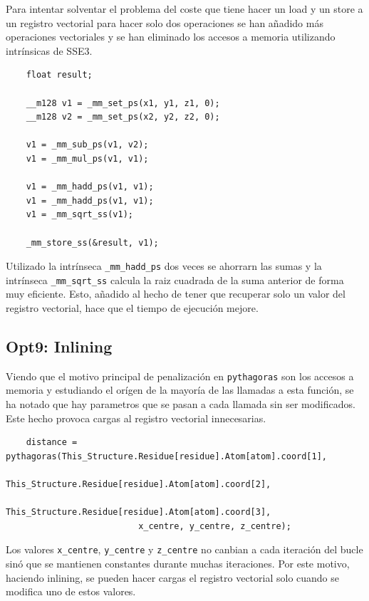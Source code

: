 Para intentar solventar el problema del coste que tiene hacer un load y un store
a un registro vectorial para hacer solo dos operaciones se han a\~{n}adido
m\'{a}s operaciones vectoriales y se han eliminado los accesos a memoria
utilizando intr\'{i}nsicas de SSE3.

\begin{lstlisting}
	float result;
	
	__m128 v1 = _mm_set_ps(x1, y1, z1, 0);
	__m128 v2 = _mm_set_ps(x2, y2, z2, 0);
	
	v1 = _mm_sub_ps(v1, v2);
	v1 = _mm_mul_ps(v1, v1);

	v1 = _mm_hadd_ps(v1, v1);
	v1 = _mm_hadd_ps(v1, v1);
	v1 = _mm_sqrt_ss(v1);	
	
	_mm_store_ss(&result, v1);
\end{lstlisting}

Utilizado la intr\'{i}nseca \texttt{\_mm\_hadd\_ps} dos veces se ahorrarn las
sumas y la intr\'{i}nseca \texttt{\_mm\_sqrt\_ss} calcula la raiz cuadrada de la
suma anterior de forma muy eficiente. Esto, a\~{n}adido al hecho de tener que
recuperar solo un valor del registro vectorial, hace que el tiempo de
ejecuci\'{o}n mejore.

\subsection{Opt9: Inlining}

Viendo que el motivo principal de penalizaci\'{o}n en \texttt{pythagoras} son
los accesos a memoria y estudiando el or\'{i}gen de la mayor\'{i}a de las
llamadas a esta funci\'{o}n, se ha notado que hay parametros que se pasan a cada
llamada sin ser modificados. Este hecho provoca cargas al registro vectorial
innecesarias.

\begin{lstlisting}
	distance = pythagoras(This_Structure.Residue[residue].Atom[atom].coord[1], 
						  This_Structure.Residue[residue].Atom[atom].coord[2], 
						  This_Structure.Residue[residue].Atom[atom].coord[3],
						  x_centre, y_centre, z_centre);
\end{lstlisting}
 
Los valores \texttt{x\_centre}, \texttt{y\_centre} y \texttt{z\_centre} no
canbian a cada iteraci\'{o}n del bucle sin\'{o} que se mantienen constantes
durante muchas iteraciones. Por este motivo, haciendo inlining, se pueden
hacer cargas el registro vectorial solo cuando se modifica uno de estos valores.

